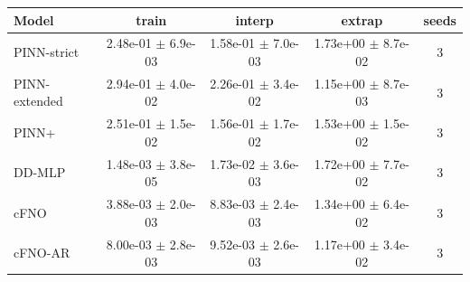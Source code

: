 \begin{tabular}{lcccc}
\toprule
Model & train & interp & extrap & seeds \\
\midrule
PINN-strict & 2.48e-01 $\pm$ 6.9e-03 & 1.58e-01 $\pm$ 7.0e-03 & 1.73e+00 $\pm$ 8.7e-02 & 3 \\
PINN-extended & 2.94e-01 $\pm$ 4.0e-02 & 2.26e-01 $\pm$ 3.4e-02 & 1.15e+00 $\pm$ 8.7e-03 & 3 \\
PINN+ & 2.51e-01 $\pm$ 1.5e-02 & 1.56e-01 $\pm$ 1.7e-02 & 1.53e+00 $\pm$ 1.5e-02 & 3 \\
DD-MLP & 1.48e-03 $\pm$ 3.8e-05 & 1.73e-02 $\pm$ 3.6e-03 & 1.72e+00 $\pm$ 7.7e-02 & 3 \\
cFNO & 3.88e-03 $\pm$ 2.0e-03 & 8.83e-03 $\pm$ 2.4e-03 & 1.34e+00 $\pm$ 6.4e-02 & 3 \\
cFNO-AR & 8.00e-03 $\pm$ 2.8e-03 & 9.52e-03 $\pm$ 2.6e-03 & 1.17e+00 $\pm$ 3.4e-02 & 3 \\
\bottomrule
\end{tabular}
